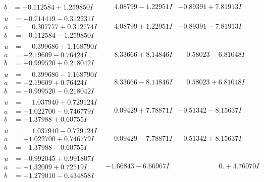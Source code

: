 \documentclass[1p]{elsarticle_modified}
\theoremstyle{definition}
\begin{document}
$$\begin{array}{c|c|c}
\begin{aligned}
b &= -0.112584 + 1.259850 I\end{aligned}
 & \phantom{-}4.08799 - 1.22951 I & -0.89391 + 7.81913 I \\ \hline\begin{aligned}
u &= -0.714419 - 0.312231 I \\
a &= \phantom{-}0.307777 + 0.312774 I \\
b &= -0.112584 - 1.259850 I\end{aligned}
 & \phantom{-}4.08799 + 1.22951 I & -0.89391 - 7.81913 I \\ \hline\begin{aligned}
u &= \phantom{-}0.399686 + 1.168790 I \\
a &= -2.19609 - 0.76424 I \\
b &= -0.999520 + 0.218042 I\end{aligned}
 & \phantom{-}8.33666 + 8.14846 I & \phantom{-}0.58023 - 6.81048 I \\ \hline\begin{aligned}
u &= \phantom{-}0.399686 - 1.168790 I \\
a &= -2.19609 + 0.76424 I \\
b &= -0.999520 - 0.218042 I\end{aligned}
 & \phantom{-}8.33666 - 8.14846 I & \phantom{-}0.58023 + 6.81048 I \\ \hline\begin{aligned}
u &= \phantom{-}1.037940 + 0.729124 I \\
a &= -1.022700 - 0.746779 I \\
b &= -1.37988 + 0.60755 I\end{aligned}
 & \phantom{-}0.09429 + 7.78871 I & -0.51342 - 8.15637 I \\ \hline\begin{aligned}
u &= \phantom{-}1.037940 - 0.729124 I \\
a &= -1.022700 + 0.746779 I \\
b &= -1.37988 - 0.60755 I\end{aligned}
 & \phantom{-}0.09429 - 7.78871 I & -0.51342 + 8.15637 I \\ \hline\begin{aligned}
u &= -0.992045 + 0.991807 I \\
a &= -1.32009 + 0.72519 I \\
b &= -1.279010 - 0.434858 I\end{aligned}
 & -1.66843 - 6.66967 I & \phantom{-0.000000 -}0. + 4.76070 I \\ \hline\begin{aligned}

\end{aligned}
\end{array}$$
\end{document}

